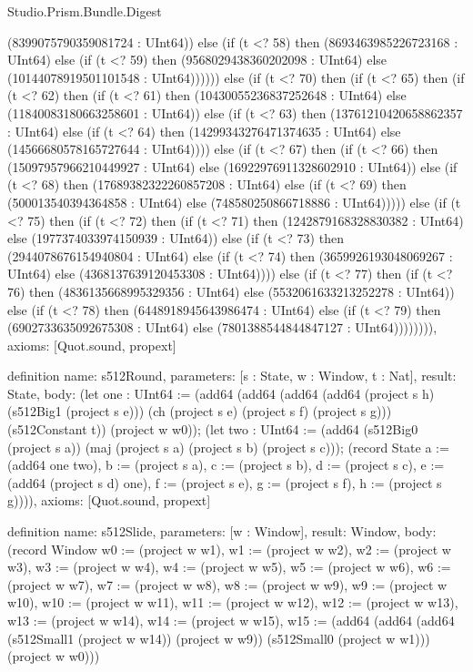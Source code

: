 \begin{lexlean}{Studio.Prism.Bundle.Digest}
\begin{semanticmodule}
{(8399075790359081724 : UInt64)) else (if (t <? 58) then (8693463985226723168 : UInt64) else (if (t <? 59) then (9568029438360202098 : UInt64) else (10144078919501101548 : UInt64)))))) else (if (t <? 70) then (if (t <? 65) then (if (t <? 62) then (if (t <? 61) then (10430055236837252648 : UInt64) else (11840083180663258601 : UInt64)) else (if (t <? 63) then (13761210420658862357 : UInt64) else (if (t <? 64) then (14299343276471374635 : UInt64) else (14566680578165727644 : UInt64)))) else (if (t <? 67) then (if (t <? 66) then (15097957966210449927 : UInt64) else (16922976911328602910 : UInt64)) else (if (t <? 68) then (17689382322260857208 : UInt64) else (if (t <? 69) then (500013540394364858 : UInt64) else (748580250866718886 : UInt64))))) else (if (t <? 75) then (if (t <? 72) then (if (t <? 71) then (1242879168328830382 : UInt64) else (1977374033974150939 : UInt64)) else (if (t <? 73) then (2944078676154940804 : UInt64) else (if (t <? 74) then (3659926193048069267 : UInt64) else (4368137639120453308 : UInt64)))) else (if (t <? 77) then (if (t <? 76) then (4836135668995329356 : UInt64) else (5532061633213252278 : UInt64)) else (if (t <? 78) then (6448918945643986474 : UInt64) else (if (t <? 79) then (6902733635092675308 : UInt64) else (7801388544844847127 : UInt64)))))))),
  axioms: [Quot.sound, propext]
}

definition{
  name: s512Round,
  parameters: [s : State, w : Window, t : Nat],
  result: State,
  body: (let one : UInt64 := (add64 (add64 (add64 (add64 (project s h) (s512Big1 (project s e))) (ch (project s e) (project s f) (project s g))) (s512Constant t)) (project w w0)); (let two : UInt64 := (add64 (s512Big0 (project s a)) (maj (project s a) (project s b) (project s c))); (record State {a := (add64 one two), b := (project s a), c := (project s b), d := (project s c), e := (add64 (project s d) one), f := (project s e), g := (project s f), h := (project s g)}))),
  axioms: [Quot.sound, propext]
}

definition{
  name: s512Slide,
  parameters: [w : Window],
  result: Window,
  body: (record Window {w0 := (project w w1), w1 := (project w w2), w2 := (project w w3), w3 := (project w w4), w4 := (project w w5), w5 := (project w w6), w6 := (project w w7), w7 := (project w w8), w8 := (project w w9), w9 := (project w w10), w10 := (project w w11), w11 := (project w w12), w12 := (project w w13), w13 := (project w w14), w14 := (project w w15), w15 := (add64 (add64 (add64 (s512Small1 (project w w14)) (project w w9)) (s512Small0 (project w w1))) (project w w0))})
}


\end{semanticmodule}
\end{lexlean}
